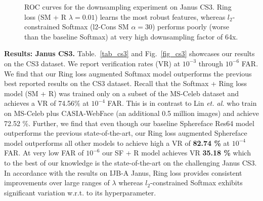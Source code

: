 \documentclass[10pt,twocolumn,letterpaper]{article}
\begin{document}
\begin{figure*}%
    \begin{center}
    \end{center}
    \vspace{-0.5cm}
\caption{ ROC curves for the downsampling experiment on Janus CS3. Ring loss (SM + R $\lambda=0.01$) learns the most robust features, whereas $l_2$-constrained Softmax (l2-Cons SM $\alpha=30$) \cite{ranjan2017l2} performs poorly (worse than the baseline Softmax) at very high downsampling factor of 64x. }
\label{fig_scale2}
\vspace{-0.5cm}
\end{figure*}

\textbf{Results: Janus CS3.} Table.~\ref{tab_cs3} and Fig.~\ref{fig_cs3} showcases our results on the CS3 dataset. We report verification rates (VR) at $10^{-3}$ through $10^{-6}$ FAR. We find that our Ring loss augmented Softmax model outperforms the previous best reported results on the CS3 dataset. Recall that the Softmax + Ring loss model (SM + R) was trained only on a subset of the MS-Celeb dataset and achieves a VR of 74.56\% at $10^{-4}$ FAR. This is in contrast to Lin \emph{et. al.} who train on MS-Celeb plus CASIA-WebFace (an additional 0.5 million images) and achieve 72.52 \%. Further, we find that even though our baseline Sphereface Res64 model outperforms the previous state-of-the-art, our Ring loss augmented Sphereface model outperforms all other models to achieve high a VR of \textbf{82.74 \%} at $10^{-4}$ FAR. At very low FAR of $10^{-6}$ our SF + R model achieves VR \textbf{35.18 \%} which to the best of our knowledge is the state-of-the-art on the challenging Janus CS3. In accordance with the results on IJB-A Janus, Ring loss provides consistent improvements over large ranges of $\lambda$ whereas $l_2$-constrained Softmax exhibits significant variation w.r.t. to its hyperparameter.
\end{document}
